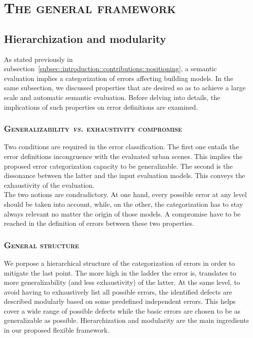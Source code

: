 \minitoc

\vfill

\clearpage

\section{\textsc{The general framework}}

    \subsection{Hierarchization and modularity}
        As stated previously in subsection~\ref{subsec::introduction::contributions::positioning}, a semantic evaluation implies a categorization of errors affecting building models.
        In the same subsection, we discussed properties that are desired so as to achieve a large scale and automatic semantic evaluation.
        Before delving into details, the implications of such properties on error definitions are examined.\\

        \subsubsection{\textsc{Generalizability \textit{vs.} exhaustivity compromise}}
            Two conditions are required in the error classification.
            The first one entails the error definitions incongruence with the evaluated urban scenes.
            This implies the proposed error categorization capacity to be generalizable.
            The second is the dissonance between the latter and the input evaluation models.
            This conveys the exhaustivity of the evaluation.\\
            The two notions are condradictory.
            At one hand, every possible error at any level should be taken into account, while, on the other, the categorization has to stay always relevant no matter the origin of those models.
            A compromise have to be reached in the definition of errors between these two properties.\\
        
        \subsubsection{\textsc{General structure}}
            We porpose a hierarchical structure of the categorization of errors in order to mitigate the last point.
            The more high in the ladder the error is, translates to more generalizability (and less exhaustivity) of the latter.
            At the same level, to avoid having to exhaustively list all possible errors, the identified defects are described modularly based on some predefined independent errors.
            This helps cover a wide range of possible defects while the basic errors are chosen to be as generalizable as possible.
            Hierarchization and modularity are the main ingredients in our proposed flexible framework.\\

